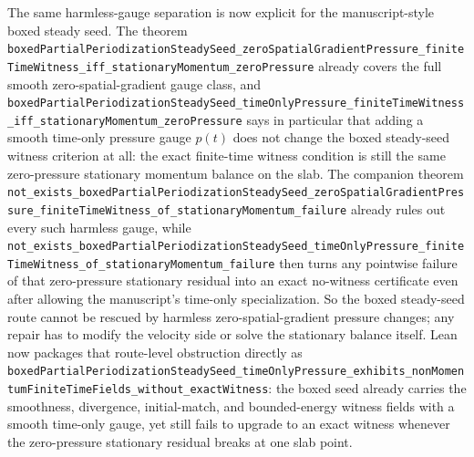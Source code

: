 \documentclass[11pt]{article}
\theoremstyle{remark}
\begin{document}
The same harmless-gauge separation is now explicit for the manuscript-style
boxed steady seed.  The theorem
\texttt{boxedPartialPeriodizationSteadySeed\_zeroSpatialGradientPressure\_finiteTimeWitness\_iff\_stationaryMomentum\_zeroPressure}
already covers the full smooth zero-spatial-gradient gauge class, and
\texttt{boxedPartialPeriodizationSteadySeed\_timeOnlyPressure\_finiteTimeWitness\_iff\_stationaryMomentum\_zeroPressure}
says in particular that adding a smooth time-only pressure gauge \(p(t)\) does
not change the boxed steady-seed witness criterion at all: the exact finite-time
witness condition is still the same zero-pressure stationary momentum balance on
the slab.  The companion theorem
\texttt{not\_exists\_boxedPartialPeriodizationSteadySeed\_zeroSpatialGradientPressure\_finiteTimeWitness\_of\_stationaryMomentum\_failure}
already rules out every such harmless gauge, while
\texttt{not\_exists\_boxedPartialPeriodizationSteadySeed\_timeOnlyPressure\_finiteTimeWitness\_of\_stationaryMomentum\_failure}
then turns any pointwise failure of that zero-pressure stationary residual into
an exact no-witness certificate even after allowing the manuscript's time-only
specialization.  So the boxed steady-seed route cannot be rescued by harmless
zero-spatial-gradient pressure changes; any repair has to modify the velocity
side or solve the stationary balance itself.  Lean now packages that route-level
obstruction directly as
\texttt{boxedPartialPeriodizationSteadySeed\_timeOnlyPressure\_exhibits\_nonMomentumFiniteTimeFields\_without\_exactWitness}:
the boxed seed already carries the smoothness, divergence, initial-match, and
bounded-energy witness fields with a smooth time-only gauge, yet still fails to
upgrade to an exact witness whenever the zero-pressure stationary residual
breaks at one slab point.
\end{document}
